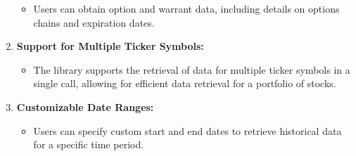 \documentclass[
  letterpaper,
  DIV=11,
  numbers=noendperiod]{scrreprt}
\providecommand{\tightlist}{%
  \setlength{\itemsep}{0pt}\setlength{\parskip}{0pt}}\usepackage{longtable,booktabs,array}
\begin{document}
\begin{enumerate}
  \begin{itemize}
  \tightlist
  \item
    Users can obtain option and warrant data, including details on
    options chains and expiration dates.
  \end{itemize}
\item
  \textbf{Support for Multiple Ticker Symbols:}

  \begin{itemize}
  \tightlist
  \item
    The library supports the retrieval of data for multiple ticker
    symbols in a single call, allowing for efficient data retrieval for
    a portfolio of stocks.
  \end{itemize}
\item
  \textbf{Customizable Date Ranges:}

  \begin{itemize}
  \tightlist
  \item
    Users can specify custom start and end dates to retrieve historical
    data for a specific time period.
  \end{itemize}
\end{enumerate}
\end{document}
